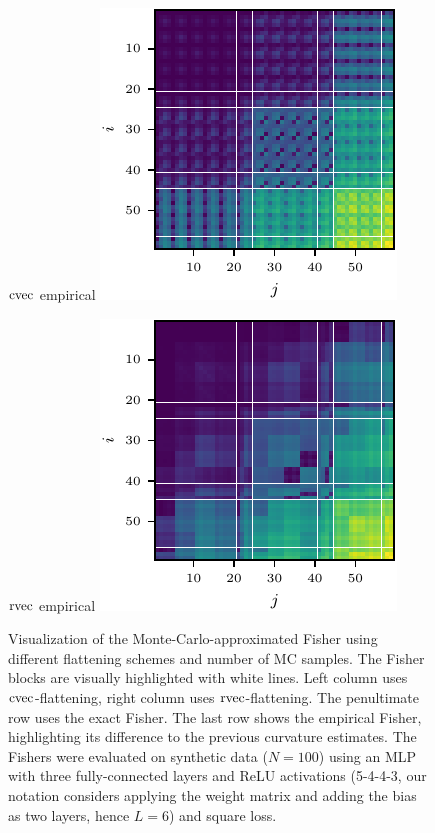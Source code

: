 \begin{figure}
  \begin{minipage}[t]{0.495\linewidth}
    \centering
    $\operatorname{cvec}$ empirical\vspace{1ex}
    \includegraphics[width=0.8\linewidth]{../kfs/plots/synthetic_cvec_empfisher.pdf}
  \end{minipage}
  \hfill
  \begin{minipage}[t]{0.495\linewidth}
    \centering
    $\operatorname{rvec}$ empirical\vspace{1ex}
    \includegraphics[width=0.8\linewidth]{../kfs/plots/synthetic_rvec_empfisher.pdf}
  \end{minipage}
  \caption{Visualization of the Monte-Carlo-approximated Fisher using different flattening schemes and number of MC samples.
    The Fisher blocks are visually highlighted with white lines.
    Left column uses $\operatorname{cvec}$-flattening, right column uses $\operatorname{rvec}$-flattening.
    The penultimate row uses the exact Fisher. The last row shows the empirical Fisher, highlighting its difference to the previous curvature estimates.
    The Fishers were evaluated on synthetic data ($N=100$) using an MLP with three fully-connected layers and ReLU activations (5-4-4-3, our notation considers applying the weight matrix and adding the bias as two layers, hence $L=6$) and square loss.
  }
\end{figure}


